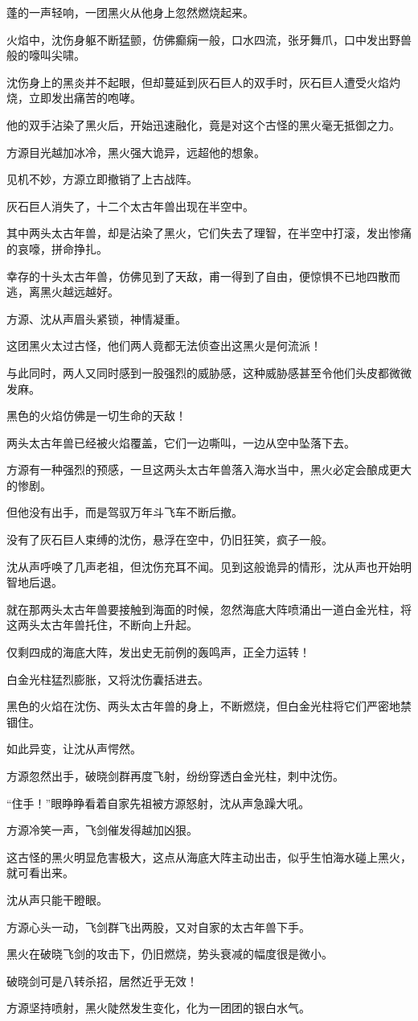\begin{this_body}
蓬的一声轻响，一团黑火从他身上忽然燃烧起来。

火焰中，沈伤身躯不断猛颤，仿佛癫痫一般，口水四流，张牙舞爪，口中发出野兽般的嚎叫尖啸。

沈伤身上的黑炎并不起眼，但却蔓延到灰石巨人的双手时，灰石巨人遭受火焰灼烧，立即发出痛苦的咆哮。

他的双手沾染了黑火后，开始迅速融化，竟是对这个古怪的黑火毫无抵御之力。

方源目光越加冰冷，黑火强大诡异，远超他的想象。

见机不妙，方源立即撤销了上古战阵。

灰石巨人消失了，十二个太古年兽出现在半空中。

其中两头太古年兽，却是沾染了黑火，它们失去了理智，在半空中打滚，发出惨痛的哀嚎，拼命挣扎。

幸存的十头太古年兽，仿佛见到了天敌，甫一得到了自由，便惊惧不已地四散而逃，离黑火越远越好。

方源、沈从声眉头紧锁，神情凝重。

这团黑火太过古怪，他们两人竟都无法侦查出这黑火是何流派！

与此同时，两人又同时感到一股强烈的威胁感，这种威胁感甚至令他们头皮都微微发麻。

黑色的火焰仿佛是一切生命的天敌！

两头太古年兽已经被火焰覆盖，它们一边嘶叫，一边从空中坠落下去。

方源有一种强烈的预感，一旦这两头太古年兽落入海水当中，黑火必定会酿成更大的惨剧。

但他没有出手，而是驾驭万年斗飞车不断后撤。

没有了灰石巨人束缚的沈伤，悬浮在空中，仍旧狂笑，疯子一般。

沈从声呼唤了几声老祖，但沈伤充耳不闻。见到这般诡异的情形，沈从声也开始明智地后退。

就在那两头太古年兽要接触到海面的时候，忽然海底大阵喷涌出一道白金光柱，将这两头太古年兽托住，不断向上升起。

仅剩四成的海底大阵，发出史无前例的轰鸣声，正全力运转！

白金光柱猛烈膨胀，又将沈伤囊括进去。

黑色的火焰在沈伤、两头太古年兽的身上，不断燃烧，但白金光柱将它们严密地禁锢住。

如此异变，让沈从声愕然。

方源忽然出手，破晓剑群再度飞射，纷纷穿透白金光柱，刺中沈伤。

“住手！”眼睁睁看着自家先祖被方源怒射，沈从声急躁大吼。

方源冷笑一声，飞剑催发得越加凶狠。

这古怪的黑火明显危害极大，这点从海底大阵主动出击，似乎生怕海水碰上黑火，就可看出来。

沈从声只能干瞪眼。

方源心头一动，飞剑群飞出两股，又对自家的太古年兽下手。

黑火在破晓飞剑的攻击下，仍旧燃烧，势头衰减的幅度很是微小。

破晓剑可是八转杀招，居然近乎无效！

方源坚持喷射，黑火陡然发生变化，化为一团团的银白水气。

\end{this_body}

